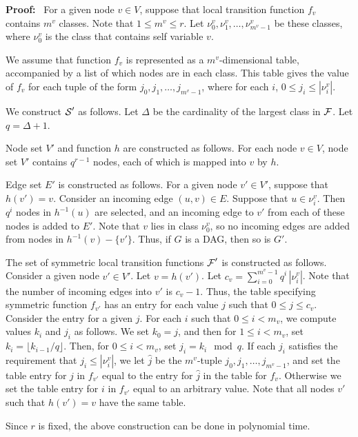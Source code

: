 \noindent
\textbf{Proof:}~ 
For a given node $v \in V$, 
suppose that local transition function $f_v$ contains $m^v$ classes.
Note that $1 \leq m^v \leq r$.
Let $\nu_0^v, \nu_1^v, \ldots ,\nu_{m^v-1}^v$ be these classes,
where $\nu_0^v$ is the class that contains self variable $v$.

We assume that function $f_v$  is represented 
as a $m^v$-dimensional table,
accompanied by a list of which nodes are in each class.
This table gives the value of $f_v$ for each tuple
of the form $j_0,  j_1, \ldots , j_{m^v -1}$,
where for each $i$, $0 \leq j_i \leq |\nu_i^v|$.

We construct $\mbox{$\mathcal{S}$}'$ as follows.
Let $\Delta$ be the cardinality of the largest class in $\mbox{$\mathcal{F}$}$.
Let $q =  \Delta + 1$.

Node set $V'$ and function $h$ are constructed as follows.
For each node $v \in V$,
node set $V'$ contains $q^{r-1}$ nodes, each of which is mapped into $v$ by $h$.

 Edge set $E'$ is constructed as follows.
For a given node $v' \in V'$,
suppose that $h(v') = v$.
Consider an incoming edge $(u,v) \in E$.
Suppose that $u \in \nu_i^v$.
Then $q^i$ nodes in $h^{-1}(u)$ are selected,
and an incoming edge to $v'$ from each of these nodes is added to $E'$.
Note that $v$  lies in class  $\nu_0^v$,
so no incoming edges are added from nodes in $h^{-1}(v) - \{v'\}$.
Thus, if $G$ is a DAG, then so is $G'$.

The set of symmetric local transition functions $\mbox{$\mathcal{F}$}'$ is constructed as follows.
Consider a given node $v' \in V'$. Let $v = h(v')$.
Let $c_v = \sum_{i=0}^{m^v-1} q^i \, |\nu_i^v|$.
Note that the number of incoming edges into $v'$ is 
$c_v -1$.
Thus, the table specifying symmetric function $f_{v'}$
has an entry for each value $j$ such that $0 \leq j \leq c_v$.
Consider the entry for a given $j$.
For each $i$ such that $0 \leq i < m_v$,
we compute values $k_i$ and $j_i$ as follows.
We set $k_0 =j$, and then for $1 \leq i < m_v$,
set $k_i = \lfloor k_{i-1}/q \rfloor$.
Then, for $0 \leq i < m_v$, set $j_i = k_i \mod q$.
If each $j_i$ satisfies the requirement that $j_i \leq | \nu_i^v |$,
we let $\hat{j}$ be the $m^v$-tuple $j_0,  j_1, \ldots , j_{m^v -1}$,
and set the table entry for $j$ in $f_{v'}$ equal to the entry for $\hat{j}$ 
 in the table for $f_v$.
Otherwise we set the table entry for $i$ in $f_{v'}$ equal to an arbitrary value.
Note that all nodes $v'$ such that $h(v')=v$ have the same table.

Since $r$ is fixed, the above construction can be done in polynomial time.

